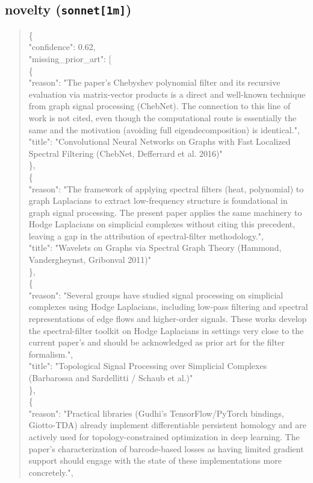 \documentclass[11pt]{article}
\begin{document}
\subsection*{novelty (\texttt{sonnet[1m]})}
\begin{quote}\small\ttfamily\raggedright
\{\\
  "confidence": 0.62,\\
  "missing\_prior\_art": [\\
    \{\\
      "reason": "The paper's Chebyshev polynomial filter and its recursive evaluation via matrix-vector products is a direct and well-known technique from graph signal processing (ChebNet). The connection to this line of work is not cited, even though the computational route is essentially the same and the motivation (avoiding full eigendecomposition) is identical.",\\
      "title": "Convolutional Neural Networks on Graphs with Fast Localized Spectral Filtering (ChebNet, Defferrard et al. 2016)"\\
    \},\\
    \{\\
      "reason": "The framework of applying spectral filters (heat, polynomial) to graph Laplacians to extract low-frequency structure is foundational in graph signal processing. The present paper applies the same machinery to Hodge Laplacians on simplicial complexes without citing this precedent, leaving a gap in the attribution of spectral-filter methodology.",\\
      "title": "Wavelets on Graphs via Spectral Graph Theory (Hammond, Vandergheynst, Gribonval 2011)"\\
    \},\\
    \{\\
      "reason": "Several groups have studied signal processing on simplicial complexes using Hodge Laplacians, including low-pass filtering and spectral representations of edge flows and higher-order signals. These works develop the spectral-filter toolkit on Hodge Laplacians in settings very close to the current paper's and should be acknowledged as prior art for the filter formalism.",\\
      "title": "Topological Signal Processing over Simplicial Complexes (Barbarossa and Sardellitti / Schaub et al.)"\\
    \},\\
    \{\\
      "reason": "Practical libraries (Gudhi's TensorFlow/PyTorch bindings, Giotto-TDA) already implement differentiable persistent homology and are actively used for topology-constrained optimization in deep learning. The paper's characterization of barcode-based losses as having limited gradient support should engage with the state of these implementations more concretely.",\\

\end{quote}
\end{document}
